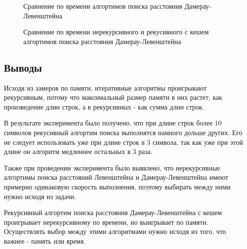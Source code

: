 \begin{figure}[!h]
	\centering
	\captionsetup{justification=centering}
    \def\svgscale{0.5}
	
	\caption{Сравнение по времени алгортимов поиска расстояния Дамерау-Левенштейна}
	\label{fig:r3}
\end{figure}

\begin{figure}[!h]
	\centering
	\captionsetup{justification=centering}
    \def\svgscale{0.45}
	
	\caption{Сравнение по времени нерекурсивного и рекусивного с кешем алгортимов поиска расстояния Дамерау-Левенштейна}
	\label{fig:r4}
\end{figure}
\pagebreak
\pagebreak

\subsection{Выводы}
Исходя из замеров по памяти, итеративные алгоритмы проигрывают рекурсивным, 
потому что максимальный размер памяти в них растет, как произведение длин строк, а в рекурсивных - как сумма длин строк.

В результате эксперимента было получено, что при длине строк более 10 символов рекусивный алгортим поиска выполнятся намного
дольше других. Его не следует использовать уже при длине строк в 3 символа, так как уже при этой длине он алгоритм медленнее остальных в 3 раза.

Также при проведении эксперимента было выявлено, что нерекурсивные алгортимы поиска расстояний Левенштейна и Дамерау-Левенштейна
имеют примерно одинаковую скорость выполнения, поэтому выбирать между ними нужно исходя из задачи.

Рекурсивный алгортим поиска расстояния Дамерау-Левенштейна с кешем проигрывает нерекурсивному по времени, но выигрывает по памяти.
Осуществлять выбор между этими алгоритмами нужно исходя из того, что важнее - память или время.

\pagebreak